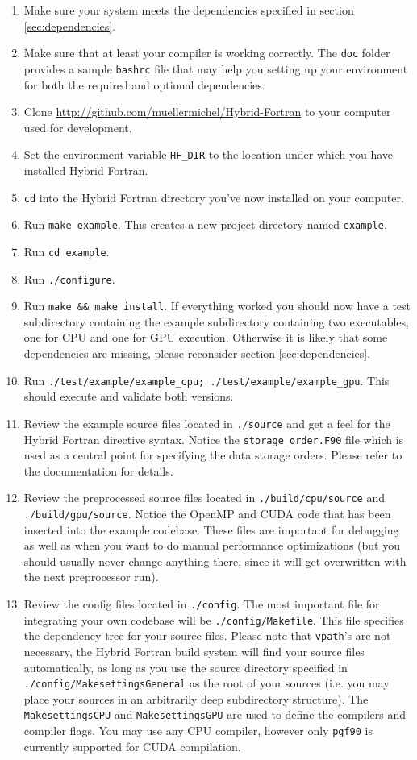 \begin{enumerate}
 \item Make sure your system meets the dependencies specified in section \ref{sec:dependencies}.
 \item Make sure that at least your compiler is working correctly. The \verb|doc| folder provides a sample \verb|bashrc| file that may help you setting up your environment for both the required and optional dependencies.
 \item Clone \url{http://github.com/muellermichel/Hybrid-Fortran} to your computer used for development.
 \item Set the environment variable \verb|HF_DIR| to the location under which you have installed Hybrid Fortran.
 \item \verb|cd| into the Hybrid Fortran directory you've now installed on your computer.
 \item Run \verb|make example|. This creates a new project directory named \verb|example|.
 \item Run \verb|cd example|.
 \item Run \verb|./configure|.
 \item Run \verb|make && make install|. If everything worked you should now have a test subdirectory containing the example subdirectory containing two executables, one for CPU and one for GPU execution. Otherwise it is likely that some dependencies are missing, please reconsider section \ref{sec:dependencies}.
 \item Run \verb|./test/example/example_cpu; ./test/example/example_gpu|. This should execute and validate both versions.
 \item Review the example source files located in \verb|./source| and get a feel for the Hybrid Fortran directive syntax. Notice the \verb|storage_order.F90| file which is used as a central point for specifying the data storage orders. Please refer to the documentation for details.
 \item Review the preprocessed source files located in \verb|./build/cpu/source| and \verb|./build/gpu/source|. Notice the OpenMP and CUDA code that has been inserted into the example codebase. These files are important for debugging as well as when you want to do manual performance optimizations (but you should usually never change anything there, since it will get overwritten with the next preprocessor run).
 \item Review the config files located in \verb|./config|. The most important file for integrating your own codebase will be \verb|./config/Makefile|. This file specifies the dependency tree for your source files. Please note that \verb|vpath|'s are not necessary, the Hybrid Fortran build system will find your source files automatically, as long as you use the source directory specified in \verb|./config/MakesettingsGeneral| as the root of your sources (i.e. you may place your sources in an arbitrarily deep subdirectory structure). The \verb|MakesettingsCPU| and \verb|MakesettingsGPU| are used to define the compilers and compiler flags. You may use any CPU compiler, however only \verb|pgf90| is currently supported for CUDA compilation.

\end{enumerate}
